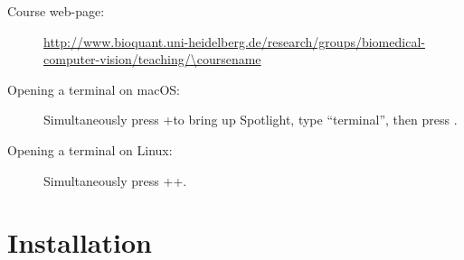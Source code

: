\documentclass[12pt,a4paper]{article}
\let\AltKey=\Alt
\let\Alt=\relax
\begin{document}

\begin{description}
\item[Course web-page:] \begin{sloppypar}\url{http://www.bioquant.uni-heidelberg.de/research/groups/biomedical-computer-vision/teaching/\coursename}\end{sloppypar}
\item[Opening a terminal on macOS:] Simultaneously press \keystroke{\cmd}+\Spacebar to bring up Spotlight, type ``terminal'', then press \Return.
\item[Opening a terminal on Linux:] Simultaneously press \Ctrl+\AltKey+.
\end{description}

\section{Installation}
\label{task:installation}
\end{document}
